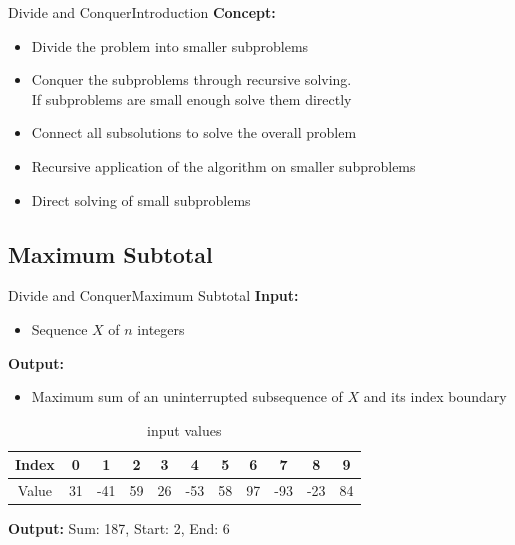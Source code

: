 


\begin{frame}{Divide and Conquer}{Introduction}
  \textbf{Concept:}
  \begin{itemize}
    \item<2->
      {\color{MainA}Divide} the problem into smaller subproblems
    \item<3->
      {\color{MainA}Conquer} the subproblems through recursive solving.\\
      If subproblems are small enough solve them directly
    \item<4->
      {\color{MainA}Connect} all subsolutions to solve the overall problem
    \item<5->
      {\color{MainA}Recursive} application of the algorithm on smaller
      subproblems
    \item<6->
      {\color{MainA}Direct} solving of small subproblems
  \end{itemize}
\end{frame}


\subsection{Maximum Subtotal}

\begin{frame}{Divide and Conquer}{Maximum Subtotal}
  \textbf{Input:}
  \begin{itemize}
    \item<2->
      Sequence {\color{MainA}$X$} of {\color{MainA}$n$} integers
  \end{itemize}
  \textbf{Output:}
  \begin{itemize}
    \item<3->
      Maximum sum of an uninterrupted subsequence of
      {\color{MainA}$X$} and its index boundary
  \end{itemize}
  \vspace{-1em}
  \begin{table}[!t]
    \caption{input values}
    \begin{tabular}{c|c|c|c|c|c|c|c|c|c|c}
      Index & 0 & 1 & 2 & 3 & 4 & 5 & 6 & 7 & 8 & 9\\
      \midrule
      Value & 31 & -41 & 59 & 26 & -53 & 58 & 97 & -93 & -23 & 84
    \end{tabular}
    \label{tab:divide_and_conquer:max_subtotal_example_values}
  \end{table}
  \vspace{1em}
  \textbf{Output:} Sum: 187, Start: 2, End: 6
\end{frame}


